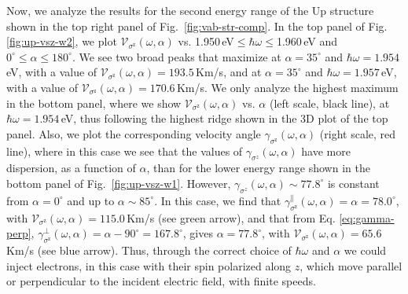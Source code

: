 \documentclass[floatfix,prb,aps,superscriptaddress,showpacs,11pt,preprint,letterpaper]{revtex4}
\begin{document}
Now, we analyze the results for the second energy range of the Up structure
shown in the top right panel of Fig.~\ref{fig:vab-str-comp}. In the top panel of
Fig. \ref{fig:up-vsz-w2}, we plot $\mathcal{V}_{\sigma^{\mathrm{z}}}
(\omega,\alpha)$ vs. 1.950\,eV$\leq\hbar\omega\leq$1.960\,eV and
$0^\circ\leq\alpha\leq 180^\circ$. We see two broad peaks that maximize at
$\alpha=35^{\circ}$ and $\hbar\omega= 1.954$\,eV, with a value of
$\mathcal{V}_{\sigma^{\mathrm{z}}}(\omega,\alpha) = 193.5$\,Km/s, and at
$\alpha=35^{\circ}$ and $\hbar\omega= 1.957$\,eV, with a value of
$\mathcal{V}_{\sigma^{\mathrm{z}}}(\omega,\alpha) = 170.6$\,Km/s. We only
analyze the highest  maximum in the bottom panel, where we  show
$\mathcal{V}_{\sigma^{\mathrm{z}}} (\omega,\alpha)$ vs. $\alpha$ (left scale,
black line), at $\hbar\omega= 1.954$\,eV, thus following the highest ridge shown
in the 3D plot of the top panel. Also, we plot the corresponding velocity angle
$\gamma_{\sigma^\mathrm{z}}(\omega,\alpha)$ (right scale, red line), where in
this case we see that the values of $\gamma_{\sigma^z}(\omega,\alpha)$ have more
dispersion, as a function of $\alpha$, than for the lower energy range shown in
the bottom panel of Fig.~\ref{fig:up-vsz-w1}. However,
$\gamma_{\sigma^z}(\omega,\alpha)\sim 77.8^\circ$ is constant from
$\alpha=0^\circ$ and up to $\alpha\sim 85^\circ$. In this case, we find that
$\gamma^\parallel_{\sigma^\mathrm{z}}(\omega,\alpha)=\alpha=78.0^\circ$, with
$\mathcal{V}_{\sigma^{\mathrm{z}}}(\omega,\alpha) = 115.0$\,Km/s (see green
arrow), and that from Eq. \eqref{eq:gamma-perp},
$\gamma^\perp_{\sigma^\mathrm{z}}(\omega,\alpha)=\alpha-90^\circ=167.8^\circ$,
gives $\alpha=77.8^\circ$, with
$\mathcal{V}_{\sigma^{\mathrm{z}}}(\omega,\alpha) = 65.6$\,Km/s (see blue
arrow). Thus, through the correct choice of $\hbar\omega$ and $\alpha$ we could
inject electrons, in this case with their spin polarized along $z$, which move
parallel or perpendicular to the incident electric field, with finite speeds.

\end{document}

